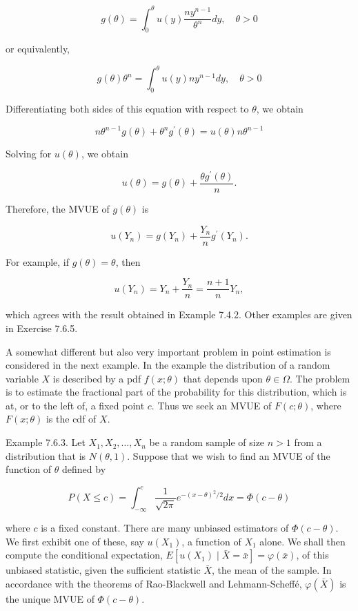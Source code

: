 $$
g(\theta)=\int_{0}^{\theta} u(y) \frac{n y^{n-1}}{\theta^{n}} d y, \quad \theta>0
$$

or equivalently,

$$
g(\theta) \theta^{n}=\int_{0}^{\theta} u(y) n y^{n-1} d y, \quad \theta>0
$$

Differentiating both sides of this equation with respect to $\theta$, we obtain

$$
n \theta^{n-1} g(\theta)+\theta^{n} g^{\prime}(\theta)=u(\theta) n \theta^{n-1}
$$

Solving for $u(\theta)$, we obtain

$$
u(\theta)=g(\theta)+\frac{\theta g^{\prime}(\theta)}{n} .
$$

Therefore, the MVUE of $g(\theta)$ is


\begin{equation*}
u\left(Y_{n}\right)=g\left(Y_{n}\right)+\frac{Y_{n}}{n} g^{\prime}\left(Y_{n}\right) . \tag{7.6.2}
\end{equation*}


For example, if $g(\theta)=\theta$, then

$$
u\left(Y_{n}\right)=Y_{n}+\frac{Y_{n}}{n}=\frac{n+1}{n} Y_{n},
$$

which agrees with the result obtained in Example 7.4.2. Other examples are given in Exercise 7.6.5.

A somewhat different but also very important problem in point estimation is considered in the next example. In the example the distribution of a random variable $X$ is described by a pdf $f(x ; \theta)$ that depends upon $\theta \in \Omega$. The problem is to estimate the fractional part of the probability for this distribution, which is at, or to the left of, a fixed point $c$. Thus we seek an MVUE of $F(c ; \theta)$, where $F(x ; \theta)$ is the cdf of $X$.

Example 7.6.3. Let $X_{1}, X_{2}, \ldots, X_{n}$ be a random sample of size $n>1$ from a distribution that is $N(\theta, 1)$. Suppose that we wish to find an MVUE of the function of $\theta$ defined by

$$
P(X \leq c)=\int_{-\infty}^{c} \frac{1}{\sqrt{2 \pi}} e^{-(x-\theta)^{2} / 2} d x=\Phi(c-\theta)
$$

where $c$ is a fixed constant. There are many unbiased estimators of $\Phi(c-\theta)$. We first exhibit one of these, say $u\left(X_{1}\right)$, a function of $X_{1}$ alone. We shall then compute the conditional expectation, $E\left[u\left(X_{1}\right) \mid \bar{X}=\bar{x}\right]=\varphi(\bar{x})$, of this unbiased statistic, given the sufficient statistic $\bar{X}$, the mean of the sample. In accordance with the theorems of Rao-Blackwell and Lehmann-Scheffé, $\varphi(\bar{X})$ is the unique MVUE of $\Phi(c-\theta)$.

